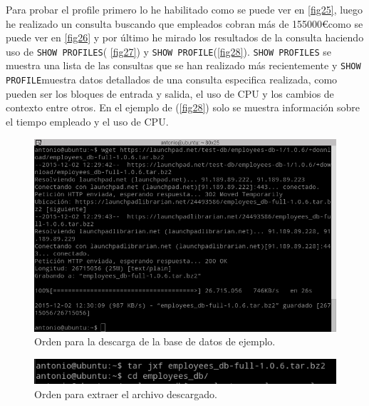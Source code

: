 Para probar el profile primero lo he habilitado como se puede ver en \cref{fig25}, luego he realizado un consulta buscando que empleados cobran más de 155000\euro como se puede ver en \cref{fig26} y por último he mirado los resultados de la consulta haciendo uso de \texttt{SHOW PROFILES}( \cref{fig27}) y \texttt{SHOW PROFILE}(\cref{fig28}). \texttt{SHOW PROFILES} se muestra una lista de las consultas que se han realizado más recientemente y \texttt{SHOW PROFILE}muestra datos detallados de una consulta especifica realizada, como pueden ser los bloques de entrada y salida, el uso de CPU y los cambios de contexto entre otros. En el ejemplo de (\cref{fig28}) solo se muestra información sobre el tiempo empleado y el uso de CPU. \cite{db2}

\begin{figure}[H]
  \begin{center}
    \includegraphics[width=1\textwidth]{imagenes/descarga}
    \caption{Orden para la descarga de la base de datos de ejemplo.}
    \label{fig22}
  \end{center}
\end{figure}

\begin{figure}[H]
  \begin{center}
    \includegraphics[width=1\textwidth]{imagenes/extraccion}
    \caption{Orden para extraer el archivo descargado.}
    \label{fig23}
  \end{center}
\end{figure}

